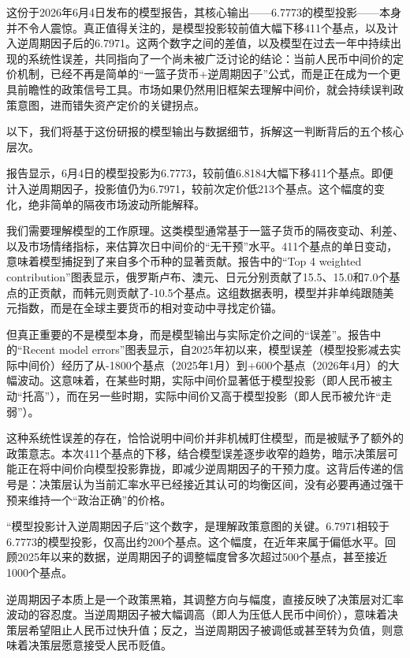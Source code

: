 \documentclass[11pt]{ctexart}
\begin{document}
这份于2026年6月4日发布的模型报告，其核心输出——6.7773的模型投影——本身并不令人震惊。真正值得关注的，是模型投影较前值大幅下移411个基点，以及计入逆周期因子后的6.7971。这两个数字之间的差值，以及模型在过去一年中持续出现的系统性误差，共同指向了一个尚未被广泛讨论的结论：当前人民币中间价的定价机制，已经不再是简单的“一篮子货币+逆周期因子”公式，而是正在成为一个更具前瞻性的政策信号工具。市场如果仍然用旧框架去理解中间价，就会持续误判政策意图，进而错失资产定价的关键拐点。

以下，我们将基于这份研报的模型输出与数据细节，拆解这一判断背后的五个核心层次。

报告显示，6月4日的模型投影为6.7773，较前值6.8184大幅下移411个基点。即便计入逆周期因子，投影值仍为6.7971，较前次定价低213个基点。这个幅度的变化，绝非简单的隔夜市场波动所能解释。

我们需要理解模型的工作原理。这类模型通常基于一篮子货币的隔夜变动、利差、以及市场情绪指标，来估算次日中间价的“无干预”水平。411个基点的单日变动，意味着模型捕捉到了来自多个币种的显著贡献。报告中的“Top 4 weighted contribution”图表显示，俄罗斯卢布、澳元、日元分别贡献了15.5、15.0和7.0个基点的正贡献，而韩元则贡献了-10.5个基点。这组数据表明，模型并非单纯跟随美元指数，而是在全球主要货币的相对变动中寻找定价锚。

但真正重要的不是模型本身，而是模型输出与实际定价之间的“误差”。报告中的“Recent model errors”图表显示，自2025年初以来，模型误差（模型投影减去实际中间价）经历了从-1800个基点（2025年1月）到+600个基点（2026年4月）的大幅波动。这意味着，在某些时期，实际中间价显著低于模型投影（即人民币被主动“托高”），而在另一些时期，实际中间价又高于模型投影（即人民币被允许“走弱”）。

这种系统性误差的存在，恰恰说明中间价并非机械盯住模型，而是被赋予了额外的政策意志。本次411个基点的下移，结合模型误差逐步收窄的趋势，暗示决策层可能正在将中间价向模型投影靠拢，即减少逆周期因子的干预力度。这背后传递的信号是：决策层认为当前汇率水平已经接近其认可的均衡区间，没有必要再通过强干预来维持一个“政治正确”的价格。

“模型投影计入逆周期因子后”这个数字，是理解政策意图的关键。6.7971相较于6.7773的模型投影，仅高出约200个基点。这个幅度，在近年来属于偏低水平。回顾2025年以来的数据，逆周期因子的调整幅度曾多次超过500个基点，甚至接近1000个基点。

逆周期因子本质上是一个政策黑箱，其调整方向与幅度，直接反映了决策层对汇率波动的容忍度。当逆周期因子被大幅调高（即人为压低人民币中间价），意味着决策层希望阻止人民币过快升值；反之，当逆周期因子被调低或甚至转为负值，则意味着决策层愿意接受人民币贬值。
\end{document}
